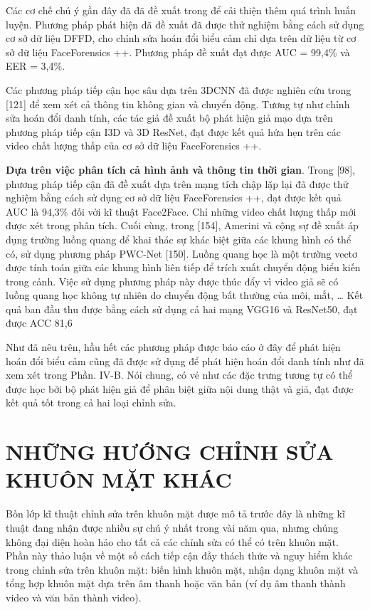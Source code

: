 \documentclass{article}
\begin{document}
Các cơ chế chú ý gần đây đã đã đề xuất trong  để cải thiện thêm quá trình huấn luyện. Phương pháp phát hiện đã đề xuất đã được thử nghiệm bằng cách sử dụng cơ sở dữ liệu DFFD, cho chỉnh sửa hoán đổi biểu cảm chỉ dựa trên dữ liệu từ cơ sở dữ liệu FaceForensics ++. Phương pháp đề xuất đạt được AUC = 99,4\% và EER = 3,4\%.

Các phương pháp tiếp cận học sâu dựa trên 3DCNN đã được nghiên cứu trong [121] để xem xét cả thông tin không gian và chuyển động. Tương tự như chỉnh sửa hoán đổi danh tính, các tác giả đề xuất bộ phát hiện giả mạo dựa trên phương pháp tiếp cận I3D và 3D ResNet, đạt được kết quả hứa hẹn trên các video chất lượng thấp của cơ sở dữ liệu FaceForensics ++.

\textbf{Dựa trên việc phân tích cả hình ảnh và thông tin thời gian}. Trong [98], phương pháp tiếp cận đã đề xuất dựa trên mạng tích chập lặp lại đã được thử nghiệm bằng cách sử dụng cơ sở dữ liệu FaceForensics ++, đạt được kết quả AUC là 94,3\% đối với kĩ thuật Face2Face. Chỉ những video chất lượng thấp mới được xét trong phân tích. Cuối cùng, trong [154], Amerini và cộng sự đề xuất áp dụng trường luồng quang để khai thác sự khác biệt giữa các khung hình có thể có, sử dụng phương pháp PWC-Net [150]. Luồng quang học là một trường vectơ được tính toán giữa các khung hình liên tiếp để trích xuất chuyển động biểu kiến trong cảnh. Việc sử dụng phương pháp này được thúc đẩy vì video giả sẽ có luồng quang học không tự nhiên do chuyển động bất thường của môi, mắt, … Kết quả ban đầu thu được bằng cách sử dụng cả hai mạng VGG16 và ResNet50, đạt được ACC 81,6%

Như đã nêu trên, hầu hết các phương pháp được báo cáo ở đây để phát hiện hoán đổi biểu cảm cũng đã được sử dụng để phát hiện hoán đổi danh tính như đã xem xét trong Phần. IV-B. Nói chung, có vẻ như các đặc trưng tương tự có thể được học bởi bộ phát hiện giả để phân biệt giữa nội dung thật và giả, đạt được kết quả tốt trong cả hai loại chỉnh sửa.

\section{NHỮNG HƯỚNG CHỈNH SỬA KHUÔN MẶT KHÁC}

Bốn lớp kĩ thuật chỉnh sửa trên khuôn mặt được mô tả trước đây là những kĩ thuật đang nhận được nhiều sự chú ý nhất trong vài năm qua, nhưng chúng không đại diện hoàn hảo cho tất cả các chỉnh sửa có thể có trên khuôn mặt. Phần này thảo luận về một số cách tiếp cận đầy thách thức và nguy hiểm khác trong chỉnh sửa trên khuôn mặt: biến hình khuôn mặt, nhận dạng khuôn mặt và tổng hợp khuôn mặt dựa trên âm thanh hoặc văn bản (ví dụ âm thanh thành video và văn bản thành video).
\end{document}
